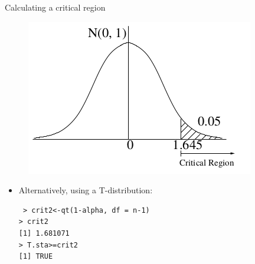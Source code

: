 \documentclass[handout]{beamer}
\begin{document}
\begin{frame}[fragile]{Calculating a critical region}
\scriptsize{

 \begin{figure}[h!]
	\centering
	\includegraphics[scale=0.47]{pics/critregion.png}
\end{figure}


 \begin{itemize}
 \item Alternatively, using a T-distribution:
 \begin{verbatim}
 > crit2<-qt(1-alpha, df = n-1)
> crit2
[1] 1.681071
> T.sta>=crit2
[1] TRUE
 \end{verbatim}

 
\end{itemize}


} 
\end{frame}
\end{document}
